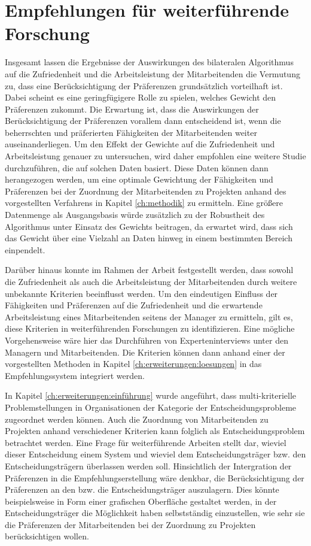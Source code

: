 \section{Empfehlungen für weiterführende Forschung}
Insgesamt lassen die Ergebnisse der Auswirkungen des bilateralen Algorithmus auf die Zufriedenheit und die Arbeitsleistung der Mitarbeitenden die Vermutung zu, dass eine Berücksichtigung der Präferenzen grundsätzlich vorteilhaft ist.
Dabei scheint es eine geringfügigere Rolle zu spielen, welches Gewicht den Präferenzen zukommt.
Die Erwartung ist, dass die Auswirkungen der Berücksichtigung der Präferenzen vorallem dann entscheidend ist, wenn die beherrschten und präferierten Fähigkeiten der Mitarbeitenden weiter auseinanderliegen.
Um den Effekt der Gewichte auf die Zufriedenheit und Arbeitsleistung genauer zu untersuchen, wird daher empfohlen eine weitere Studie durchzuführen, die auf solchen Daten basiert.
Diese Daten können dann herangezogen werden, um eine optimale Gewichtung der Fähigkeiten und Präferenzen bei der Zuordnung der Mitarbeitenden zu Projekten anhand des vorgestellten Verfahrens in Kapitel \ref{ch:methodik} zu ermitteln.
Eine größere Datenmenge als Ausgangsbasis würde zusätzlich zu der Robustheit des Algorithmus unter Einsatz des Gewichts beitragen, da erwartet wird, dass sich das Gewicht über eine Vielzahl an Daten hinweg in einem bestimmten Bereich einpendelt.

Darüber hinaus konnte im Rahmen der Arbeit festgestellt werden, dass sowohl die Zufriedenheit als auch die Arbeitsleistung der Mitarbeitenden durch weitere unbekannte Kriterien beeinflusst werden.
Um den eindeutigen Einfluss der Fähigkeiten und Präferenzen auf die Zufriedenheit und die erwartende Arbeitsleistung eines Mitarbeitenden seitens der Manager zu ermitteln, gilt es, diese Kriterien in weiterführenden Forschungen zu identifizieren.
Eine mögliche Vorgehensweise wäre hier das Durchführen von Experteninterviews unter den Managern und Mitarbeitenden.
Die Kriterien können dann anhand einer der vorgestellten Methoden in Kapitel \ref{ch:erweiterungen:loesungen} in das Empfehlungssystem integriert werden.

In Kapitel \ref{ch:erweiterungen:einführung} wurde angeführt, dass multi-kriterielle Problemstellungen in Organisationen der Kategorie der Entscheidungsprobleme zugeordnet werden können.
Auch die Zuordnung von Mitarbeitenden zu Projekten anhand verschiedener Kriterien kann folglich als Entscheidungsproblem betrachtet werden.
Eine Frage für weiterführende Arbeiten stellt dar, wieviel dieser Entscheidung einem System und wieviel dem Entscheidungsträger bzw. den Entscheidungsträgern überlassen werden soll.
Hinsichtlich der Intergration der Präferenzen in die Empfehlungserstellung wäre denkbar, die Berücksichtigung der Präferenzen an den bzw. die Entscheidungsträger auszulagern.
Dies könnte beispielsweise in Form einer grafischen Oberfläche gestaltet werden, in der Entscheidungsträger die Möglichkeit haben selbstständig einzustellen, wie sehr sie die Präferenzen der Mitarbeitenden bei der Zuordnung zu Projekten berücksichtigen wollen.

